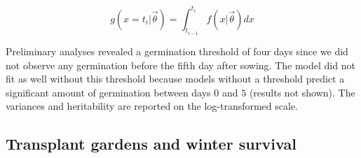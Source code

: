 \documentclass[
  12pt,
]{article}
\begin{document}
\[g(x=t_i|\vec{\theta}) = \int_{t_{i-1}}^{t_i} f(x|\vec{\theta}) dx\]

Preliminary analyses revealed a germination threshold of four days since we did not observe any germination before the fifth day after sowing. The model did not fit as well without this threshold because models without a threshold predict a significant amount of germination between days \(0\) and \(5\) (results not shown). The variances and heritability are reported on the log-transformed scale.

\hypertarget{transplant-gardens-and-winter-survival}{%
\subsection{Transplant gardens and winter survival}\label{transplant-gardens-and-winter-survival}}
\end{document}
